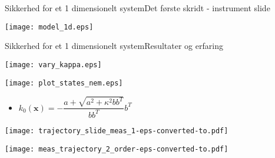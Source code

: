 \begin{frame}{Sikkerhed for et 1 dimensionelt system}{Det første skridt - instrument slide}
\begin{minipage}{0.35\textwidth}
\hspace*{-0.5cm}
\texttt{[image: model\_1d.eps]}

\end{minipage}
\end{frame}


\begin{frame}{Sikkerhed for et 1 dimensionelt system}{Resultater og erfaring}
\begin{minipage}{0.48\textwidth}
\texttt{[image: vary\_kappa.eps]}

\texttt{[image: plot\_states\_nem.eps]}

\begin{itemize}
	\item \scriptsize $k_0(\textbf{x}) = -\dfrac{a + \sqrt{a^2 + \kappa^2 b b^T}}{b b^T} b^T$
\end{itemize}





\end{minipage}
\begin{minipage}{0.48\textwidth}
{\color{white}{white}}
\texttt{[image: trajectory\_slide\_meas\_1-eps-converted-to.pdf]}

\vspace*{0.05cm}
\texttt{[image: meas\_trajectory\_2\_order-eps-converted-to.pdf]}

\end{minipage}
\end{frame}

